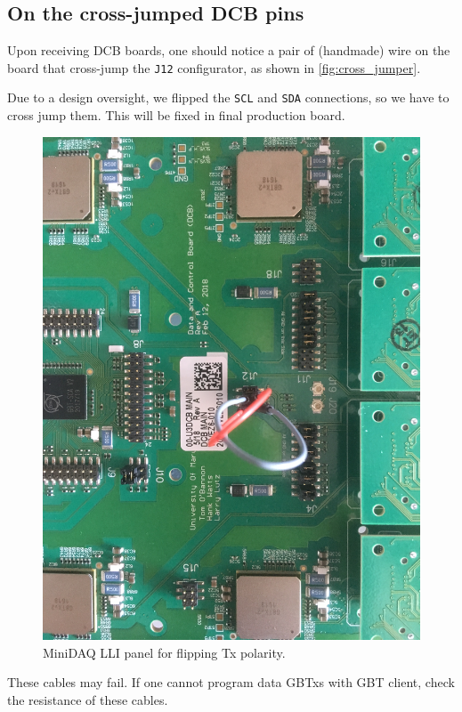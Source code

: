 \subsection{On the cross-jumped DCB pins}
\label{sec:cross_jumper}
Upon receiving DCB boards, one should notice a pair of (handmade) wire on the
board that cross-jump the \texttt{J12} configurator, as shown in
\autoref{fig:cross_jumper}.

Due to a design oversight, we flipped the \texttt{SCL} and \texttt{SDA}
connections, so we have to cross jump them.
This will be fixed in final production board.

\begin{figure}[ht]
    \centering
    \includegraphics[width=\textwidth]{res/cross_jumper.jpg}
    \caption{MiniDAQ LLI panel for flipping Tx polarity.}
    \label{fig:cross_jumper}
\end{figure}

\begin{leftbar}
    These cables may fail.
    If one cannot program data GBTxs with GBT client, check the resistance of
    these cables.
\end{leftbar}
